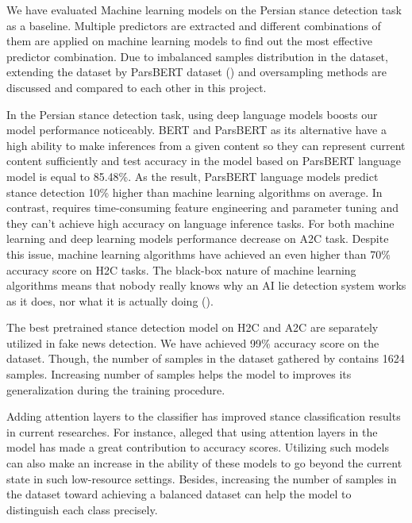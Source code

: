 We have evaluated Machine learning models on the Persian stance detection task as a baseline. Multiple predictors are extracted and different combinations of them are applied on machine learning models to find out the most effective predictor combination. Due to imbalanced samples distribution in the \cite{stance_persian} dataset, extending the dataset by \ac{ParsBERT} dataset (\cite{parsbert}) and oversampling methods are discussed and compared to each other in this project.

In the Persian stance detection task, using deep language models boosts our model performance noticeably. \ac{BERT} and \ac{ParsBERT} as its alternative have a high ability to make inferences from a given content so they can represent current content sufficiently and test accuracy in the model based on \ac{ParsBERT} language model is equal to 85.48\%. As the result,  \ac{ParsBERT} language models predict stance detection 10\% higher than machine learning algorithms on average. In contrast, requires time-consuming feature engineering and parameter tuning and they can't achieve high accuracy on language inference tasks. For both machine learning and deep learning models performance decrease on \ac{A2C} task. Despite this issue, machine learning algorithms have achieved an even higher than 70\% accuracy score on \ac{H2C} tasks. The black-box nature of machine learning algorithms means that nobody really knows why an AI lie detection system works as it does, nor what it is actually doing (\cite{book_fake}). 

The best pretrained stance detection model on \ac{H2C} and \ac{A2C} are separately utilized in fake news detection. We have achieved 99\% accuracy score on the \cite{stance_persian} dataset. Though, the number of samples in the dataset gathered by \cite{stance_persian} contains 1624 samples. Increasing number of samples helps the model to improves its generalization during the training procedure.

Adding attention layers to the classifier has improved stance classification results in current researches. For instance, \cite{book_disinformation} alleged that using attention layers in the model has made a great contribution to accuracy scores. Utilizing such models can also make an increase in the ability of these models to go beyond the current state in such low-resource settings. Besides, increasing the number of samples in the \cite{stance_persian} dataset toward achieving a balanced dataset can help the model to distinguish each class precisely. 
 
 
 